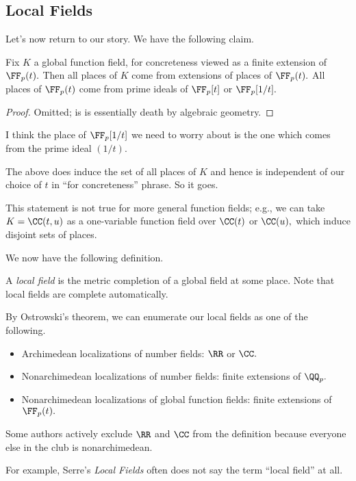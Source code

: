 \documentclass[../notes.tex]{subfiles}
\begin{document}
\subsection{Local Fields}
Let's now return to our story. We have the following claim.
\begin{proposition}
	Fix $K$ a global function field, for concreteness viewed as a finite extension of $\FF_p(t).$ Then all places of $K$ come from extensions of places of $\FF_p(t).$ All places of $\FF_p(t)$ come from prime ideals of $\FF_p[t]$ or $\FF_p[1/t].$
\end{proposition}
\begin{proof}
	Omitted; is is essentially death by algebraic geometry.
\end{proof}
\begin{remark}[Nir]
	I think the place of $\FF_p[1/t]$ we need to worry about is the one which comes from the prime ideal $(1/t).$
\end{remark}
\begin{remark}
	The above does induce the set of all places of $K$ and hence is independent of our choice of $t$ in ``for concreteness'' phrase. So it goes.
\end{remark}
\begin{remark}
	This statement is not true for more general function fields; e.g., we can take $K=\CC(t,u)$ as a one-variable function field over $\CC(t)$ or $\CC(u),$ which induce disjoint sets of places.
\end{remark}
We now have the following definition.
\begin{definition}
	A \textit{local field} is the metric completion of a global field at some place. Note that local fields are complete automatically.
\end{definition}
\begin{example}
	By Ostrowski's theorem, we can enumerate our local fields as one of the following.
	\begin{itemize}
		\item Archimedean localizations of number fields: $\RR$ or $\CC.$
		\item Nonarchimedean localizations of number fields: finite extensions of $\QQ_p.$
		\item Nonarchimedean localizations of global function fields: finite extensions of $\FF_p(t).$
	\end{itemize}
\end{example}
\begin{warn}
	Some authors actively exclude $\RR$ and $\CC$ from the definition because everyone else in the club is nonarchimedean.
\end{warn}
For example, {Serre}'s \textit{Local Fields} often does not say the term ``local field'' at all.
\end{document}
